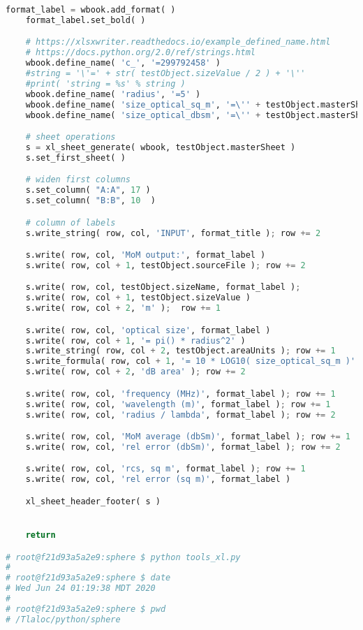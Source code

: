 {{\begin{lstlisting}[language=Python]
    format_label = wbook.add_format( )
    format_label.set_bold( )

    # https://xlsxwriter.readthedocs.io/example_defined_name.html
    # https://docs.python.org/2.0/ref/strings.html
    wbook.define_name( 'c_', '=299792458' )
    #string = '\'=' + str( testObject.sizeValue / 2 ) + '\''
    #print( 'string = %s' % string )
    wbook.define_name( 'radius', '=5' )
    wbook.define_name( 'size_optical_sq_m', '=\'' + testObject.masterSheet + '\'!$B$6' )
    wbook.define_name( 'size_optical_dbsm', '=\'' + testObject.masterSheet + '\'!$B$7' )

    # sheet operations
    s = xl_sheet_generate( wbook, testObject.masterSheet )
    s.set_first_sheet( )

    # widen first columns
    s.set_column( "A:A", 17 )
    s.set_column( "B:B", 10  )

    # column of labels
    s.write_string( row, col, 'INPUT', format_title ); row += 2

    s.write( row, col, 'MoM output:', format_label )
    s.write( row, col + 1, testObject.sourceFile ); row += 2

    s.write( row, col, testObject.sizeName, format_label );
    s.write( row, col + 1, testObject.sizeValue )
    s.write( row, col + 2, 'm' );  row += 1

    s.write( row, col, 'optical size', format_label )
    s.write( row, col + 1, '= pi() * radius^2' )
    s.write_string( row, col + 2, testObject.areaUnits ); row += 1
    s.write_formula( row, col + 1, '= 10 * LOG10( size_optical_sq_m )' );
    s.write( row, col + 2, 'dB area' ); row += 2

    s.write( row, col, 'frequency (MHz)', format_label ); row += 1
    s.write( row, col, 'wavelength (m)', format_label ); row += 1
    s.write( row, col, 'radius / lambda', format_label ); row += 2

    s.write( row, col, 'MoM average (dbSm)', format_label ); row += 1
    s.write( row, col, 'rel error (dbSm)', format_label ); row += 2

    s.write( row, col, 'rcs, sq m', format_label ); row += 1
    s.write( row, col, 'rel error (sq m)', format_label )

    xl_sheet_header_footer( s )


    return

# root@f21d93a5a2e9:sphere $ python tools_xl.py
#
# root@f21d93a5a2e9:sphere $ date
# Wed Jun 24 01:19:38 MDT 2020
#
# root@f21d93a5a2e9:sphere $ pwd
# /Tlaloc/python/sphere

	\end{lstlisting}
	}}

\endinput  %

